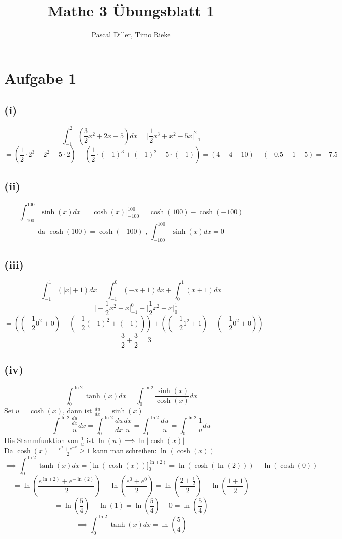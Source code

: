 \documentclass{article}
\title{Mathe 3 Übungsblatt 1}
\author{Pascal Diller, Timo Rieke}
\date{}
\begin{document}
\maketitle

\section*{Aufgabe 1}
\subsection*{(i)}

\[\int^{2}_{-1} \left( \frac{3}{2} x^2 + 2x - 5\right)dx = \bigl[ \frac{1}{2}x^3 + x^2 - 5x \bigr]^2_{-1}\]
\[ = (\frac{1}{2} \cdot 2^3 + 2^2 - 5 \cdot 2) - (\frac{1}{2} \cdot (-1)^3 + (-1)^2 - 5 \cdot (-1) ) = (4+4-10)-(-0.5 +1 + 5) = - 7.5\]

\subsection*{(ii)}
\[ \int^{100}_{-100} \sinh (x) dx= \bigl[ \cosh (x) \bigr]^{100}_{-100} = \cosh(100)-\cosh(-100) \]
\[ \text{da } \cosh(100) = \cosh(-100) \text{ , }\int^{100}_{-100} \sinh (x) dx= 0\]

\subsection*{(iii)}
\[\int^1_{-1}(|x| + 1) dx = \int^0_{-1}(-x + 1) dx + \int^1_0 (x + 1) dx\]
\[= \bigl[ -\frac{1}{2}x^2 + x \bigr]^0_{-1} + \bigl[\frac{1}{2}x^2 + x\bigr]^1_0\]
\[= \left(\left( -\frac{1}{2}0^2 + 0 \right) - \left( -\frac{1}{2}(-1)^2 + (-1) \right) \right)  + \left(\left( -\frac{1}{2}1^2 + 1 \right) - \left( -\frac{1}{2}0^2 + 0 \right) \right)\]
\[= \frac{3}{2} + \frac{3}{2} = 3\]

\subsection*{(iv)}
\[\int_0^{\ln 2} \tanh(x) dx = \int_0^{\ln 2} \frac{\sinh(x)}{\cosh(x)} dx\]
Sei $u = \cosh(x)$, dann ist $\frac{du}{dx} = \sinh(x) $%
\[\int_0^{\ln 2} \frac{\frac{du}{dx}}{u}dx = \int_0^{\ln 2} \frac{du}{dx} \frac{dx}{u} =  \int_0^{\ln 2} \frac{du}{u} = \int_0^{\ln 2} \frac{1}{u}du\]
Die Stammfunktion von $\frac{1}{u}$ ist $\ln(u) \implies \ln|\cosh(x)|$ \\
Da $\cosh(x) = \frac{e^x + e^{-x}}{2} \geq 1$ kann man schreiben: $\ln(\cosh(x))$
\[\implies \int_0^{\ln 2} \tanh(x) dx = \bigl[ \ln(\cosh(x)) \bigr]_0^{\ln(2)} = \ln(\cosh(\ln(2))) - \ln(\cosh(0))\]
\[= \ln(\frac{e^{\ln(2)} + e^{-\ln(2)}}{2}) - \ln (\frac{e^0 + e^0}{2}) = \ln(\frac{2 + \frac{1}{2}}{2}) - \ln(\frac{1+1}{2})\]
\[= \ln(\frac{5}{4}) - \ln(1) = \ln(\frac{5}{4}) - 0 = \ln(\frac{5}{4})\]
\[\implies \int_0^{\ln 2} \tanh(x)dx = \ln(\frac{5}{4})\]
\end{document}
